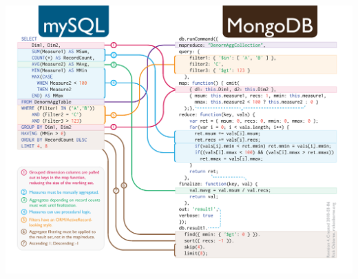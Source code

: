 \documentclass[14pt]{beamer}
\begin{document}
\begin{frame}[plain]
  \includegraphics[width=\textwidth]{img/sql-to-mongodb}
\end{frame}
\end{document}

